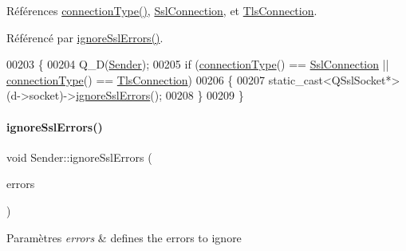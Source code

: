 Références \hyperlink{class_simple_mail_1_1_sender_a044468efe3bafa577a3039b997a4ae23}{connection\+Type()}, \hyperlink{class_simple_mail_1_1_sender_a89e6a9572b306441237f6b6635729d1aadd47ac04a99ebb279aaa4cf5cdfa78f5}{Ssl\+Connection}, et \hyperlink{class_simple_mail_1_1_sender_a89e6a9572b306441237f6b6635729d1aa3461f2931e043fc3ea86a0015c735159}{Tls\+Connection}.



Référencé par \hyperlink{class_simple_mail_1_1_sender_a05f1d8b1df8d4b3493858d4bd3991cf8}{ignore\+Ssl\+Errors()}.


\begin{DoxyCode}
00203 \{
00204     Q\_D(\hyperlink{class_simple_mail_1_1_sender}{Sender});
00205     \textcolor{keywordflow}{if} (\hyperlink{class_simple_mail_1_1_sender_a044468efe3bafa577a3039b997a4ae23}{connectionType}() == \hyperlink{class_simple_mail_1_1_sender_a89e6a9572b306441237f6b6635729d1aadd47ac04a99ebb279aaa4cf5cdfa78f5}{SslConnection} || 
      \hyperlink{class_simple_mail_1_1_sender_a044468efe3bafa577a3039b997a4ae23}{connectionType}() == \hyperlink{class_simple_mail_1_1_sender_a89e6a9572b306441237f6b6635729d1aa3461f2931e043fc3ea86a0015c735159}{TlsConnection})
00206     \{
00207         \textcolor{keyword}{static\_cast<}QSslSocket*\textcolor{keyword}{>}(d->socket)->\hyperlink{class_simple_mail_1_1_sender_a198c2a1fef662cd2323d05c1f5fa6adb}{ignoreSslErrors}();
00208     \}
00209 \}
\end{DoxyCode}
\mbox{\label{class_simple_mail_1_1_sender_a05f1d8b1df8d4b3493858d4bd3991cf8}} 
\paragraph{\texorpdfstring{ignore\+Ssl\+Errors()}{ignoreSslErrors()}\hspace{0.1cm}{\footnotesize\ttfamily [2/2]}}
{\footnotesize\ttfamily void Sender\+::ignore\+Ssl\+Errors (\begin{DoxyParamCaption}\item[{const Q\+List$<$ Q\+Ssl\+Error $>$ \&}]{errors }\end{DoxyParamCaption})}


\begin{DoxyParams}{Paramètres}
{\em errors} & defines the errors to ignore \\
\hline
\end{DoxyParams}



